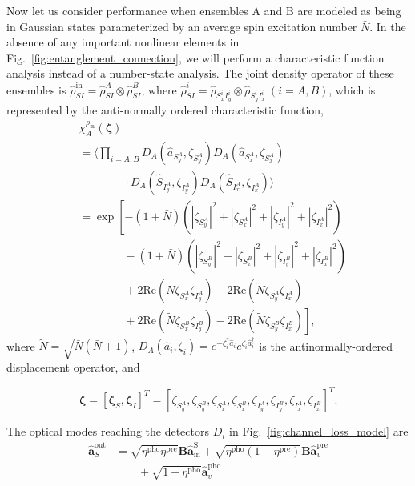\documentclass[aps,twocolumn,secnumarabic,amsmath,amssymb,pra,groupedaddress,
showpacs, showkeys,draft]{revtex4-1}
\newcommand{\pna}[1]{\left(#1\right)}
\newcommand{\pnb}[1]{\left[#1\right]}
\newcommand{\eqn}[1]{
\begin{equation}
	#1
\end{equation}
}
\begin{document}
Now let us consider performance when ensembles A and B are modeled as being in
Gaussian states parameterized by an average spin excitation number
$\bar{N}$. In the absence of any important nonlinear elements in
Fig.~\ref{fig:entanglement_connection}, we will perform a characteristic
function analysis instead of a number-state analysis. The joint density
operator of these ensembles is
$\hat{\rho}_{SI}^{\textrm{in}}=\hat{\rho}_{SI}^A\otimes \hat{\rho}_{SI}^B$,
where $\hat{\rho}_{SI}^i=\hat{\rho}_{S_x^i I_y^i}\otimes\hat{\rho}_{S_y^i
  I_x^i}~\pna{i=A,B}$, which is represented by the anti-normally ordered
characteristic function,
\begin{align}
    & \chi_A^{\rho_{\textrm{in}}}\pna{\bm{\zeta}} \nonumber \\
    & =  \langle \prod_{i=A,B} D_A\pna{\hat{a}_{S_y^A},\zeta_{S_y^A}}
        D_A\pna{\hat{a}_{S_x^A},\zeta_{S_x^A}} \nonumber \\
    & \qquad \qquad \cdot    D_A\pna{\hat{S}_{I_y^A},\zeta_{I_y^A}}
        D_A\pna{\hat{S}_{I_x^A},\zeta_{I_x^A}} \rangle \nonumber \\
    & = \exp\left[-\pna{1+\bar{N}}\pna{|\zeta_{S_y^A}|^2+|\zeta_{S_x^A}|^2+|\zeta_{I_y^A}|^2+|\zeta_{I_x^A}|^2} \right.\nonumber \\
    & \qquad \qquad \left.{}-\pna{1+\bar{N}}\pna{|\zeta_{S_y^B}|^2+|\zeta_{S_x^B}|^2+|\zeta_{I_y^B}|^2+|\zeta_{I_x^B}|^2}\right.\nonumber \\ 
    & \qquad \qquad \left. {} +2\textrm{Re}\pna{\tilde{N}\zeta_{S_x^A} \zeta_{I_y^A}}-2\textrm{Re}\pna{\tilde{N}\zeta_{S_y^A} \zeta_{I_x^A}}\right.\nonumber \\
    & \qquad \qquad \left. {} +2\textrm{Re}\pna{\tilde{N}\zeta_{S_x^B} \zeta_{I_y^B}}-2\textrm{Re}\pna{\tilde{N}\zeta_{S_y^B} \zeta_{I_x^B}}\right], 
\end{align}
where $\tilde{N}=\sqrt{\bar{N}\pna{\bar{N}+1}}$,
$D_A\pna{\hat{a}_i,\zeta_i}=e^{-\zeta_i^* \hat{a}_i}e^{\zeta_i
  \hat{a}_i^{\dagger}}$ is the antinormally-ordered displacement operator, and
\eqn{
\bm{\zeta} = \pnb{\bm{\zeta}_S, \bm{\zeta}_I}^T= \pnb{\zeta_{S^A_y},\zeta_{S^B_y},\zeta_{S^A_x},\zeta_{S^B_x},
\zeta_{I^A_y},\zeta_{I^B_y},\zeta_{I^A_x},\zeta_{I^B_x}}^{T}.
}
The optical modes reaching the detectors $D_i$ in
Fig.~\ref{fig:channel_loss_model} are
\begin{align}
\mathbf{\hat{a}}^{\textrm{out}}_S & = 
\sqrt{\eta^{\textrm{pho}}\eta^{\textrm{pre}}} \mathbf{B} \mathbf{\hat{a}}^{\textrm{S}}_{\textrm{in}}
+\sqrt{\eta^{\textrm{pho}}\pna{1-\eta^{\textrm{pre}}}}\mathbf{B} \mathbf{\hat{a}}^{\textrm{pre}}_v
 \nonumber \\ & \qquad +\sqrt{1-\eta^{\textrm{pho}}}\mathbf{\hat{a}}^{\textrm{pho}}_v
\end{align}
\end{document}
